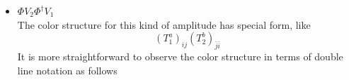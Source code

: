 \documentclass{beamer}
\begin{document}
\begin{frame}
    \begin{itemize}
        \item $\Phi V_2 \Phi^\dagger V_1$\\
        The color structure for this kind of amplitude has special form, like
        \begin{equation*}
            (T_1^a)_{ij}(T_2^b)_{\bar{j}\bar{i}}
        \end{equation*}
        It is more straightforward to observe the color structure in terms of double line notation as follows 
        \vspace{0.5em}


        \begin{tikzpicture}[x=0.75pt,y=0.75pt,yscale=-1,xscale=1]


\end{tikzpicture}
\end{itemize}
\end{frame}
\end{document}
